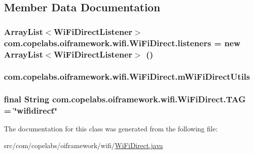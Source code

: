 \subsection{Member Data Documentation}
\hypertarget{classcom_1_1copelabs_1_1oiframework_1_1wifi_1_1_wi_fi_direct_a16e049c40f30d1043dd4ce8af55e4e61}{}
\subsubsection[{listeners}]{\setlength{\rightskip}{0pt plus 5cm}Array\+List$<${\bf Wi\+Fi\+Direct\+Listener}$>$ com.\+copelabs.\+oiframework.\+wifi.\+Wi\+Fi\+Direct.\+listeners = new Array\+List$<${\bf Wi\+Fi\+Direct\+Listener}$>$ ()}\label{classcom_1_1copelabs_1_1oiframework_1_1wifi_1_1_wi_fi_direct_a16e049c40f30d1043dd4ce8af55e4e61}
\hypertarget{classcom_1_1copelabs_1_1oiframework_1_1wifi_1_1_wi_fi_direct_af6b18480c81d0be383f27cbb3b94bd08}{}
\subsubsection[{m\+Wi\+Fi\+Direct\+Utils}]{ com.\+copelabs.\+oiframework.\+wifi.\+Wi\+Fi\+Direct.\+m\+Wi\+Fi\+Direct\+Utils\hspace{0.3cm}{\ttfamily [private]}}\label{classcom_1_1copelabs_1_1oiframework_1_1wifi_1_1_wi_fi_direct_af6b18480c81d0be383f27cbb3b94bd08}
\hypertarget{classcom_1_1copelabs_1_1oiframework_1_1wifi_1_1_wi_fi_direct_a57ef5d26ffbe7ab928d3efe5b196a3e9}{}
\subsubsection[{T\+A\+G}]{\setlength{\rightskip}{0pt plus 5cm}final String com.\+copelabs.\+oiframework.\+wifi.\+Wi\+Fi\+Direct.\+T\+A\+G = \char`\"{}wifidirect\char`\"{}\hspace{0.3cm}{\ttfamily [static]}}\label{classcom_1_1copelabs_1_1oiframework_1_1wifi_1_1_wi_fi_direct_a57ef5d26ffbe7ab928d3efe5b196a3e9}


The documentation for this class was generated from the following file\+:\begin{DoxyCompactItemize}
\item 
src/com/copelabs/oiframework/wifi/\hyperlink{_wi_fi_direct_8java}{Wi\+Fi\+Direct.\+java}\end{DoxyCompactItemize}
